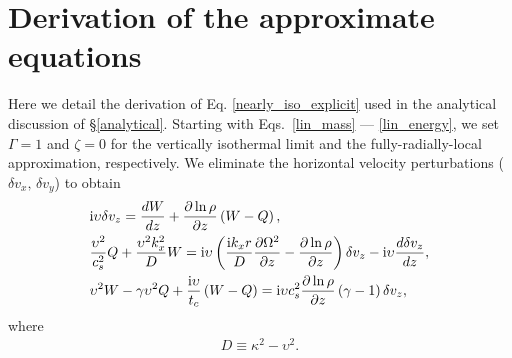 \section{Derivation of the approximate equations}\label{adia_improve}
Here we detail the derivation of Eq. \ref{nearly_iso_explicit} used in the 
analytical discussion of \S\ref{analytical}.  Starting with Eqs.\ \ref{lin_mass} --- \ref{lin_energy},
we set $\Gamma = 1$ and $\zeta = 0$ for the vertically isothermal limit and the fully-radially-local 
approximation, respectively.  We  eliminate
the horizontal velocity perturbations ($\delta v_x,\, \delta v_y$) to
obtain  
\begin{subequations}\label{A1}\begin{align}
  & \mathrm{i}\upsilon\delta v_z = \frac{dW}{dz} + \frac{\partial\ln{\rho}}{\partial z}\left(W-Q\right),\label{ode_vz} \\
  &\frac{\upsilon^2}{c_s^2}Q + \frac{\upsilon^2k_x^2}{D}W =\mathrm{i}\upsilon \left(\frac{\mathrm{i}
      k_x r}{D}\frac{\partial\Omega^2}{\partial z} -
    \frac{\partial \ln{\rho}}{\partial z}\right)\delta v_z - \mathrm{i}\upsilon \frac{d\delta v_z}{dz},
  \label{ode_w}\\
  &\upsilon^2W - \gamma\upsilon^2 Q +
  \frac{\mathrm{i}\upsilon}{t_c}\left(W-Q\right) 
  =\mathrm{i} \upsilon c_s^2\frac{\partial\ln{\rho}}{\partial z}\left(\gamma -
    1\right)\delta v_z,
  \label{ode_Q} 
\end{align}\end{subequations}
where
\begin{align}
  D \equiv \kappa^2 - \upsilon^2.
\end{align} 
%

